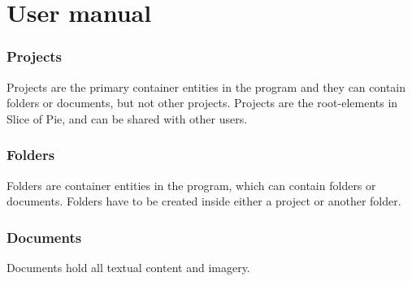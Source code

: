 \section{User manual}
\subsubsection{Projects}
Projects are the primary container entities in the program and they can contain folders or documents, but not other projects.
Projects are the root-elements in Slice of Pie, and can be shared with other users.

\subsubsection{Folders}
Folders are container entities in the program, which can contain folders or documents. Folders have to be created inside either a project or another folder.

\subsubsection{Documents}
Documents hold all textual content and imagery.




